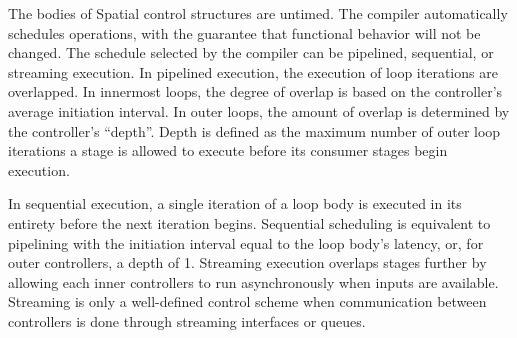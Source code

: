 The bodies of Spatial control structures are untimed. The compiler automatically schedules operations, with the guarantee that functional behavior will not be changed.
The schedule selected by the compiler can be pipelined, sequential, or streaming execution. In pipelined execution, the execution of loop iterations are overlapped.
In innermost loops, the degree of overlap is based on the controller's average initiation interval.
In outer loops, the amount of overlap is determined by the controller's ``depth''. Depth is defined as the maximum number of outer loop iterations a stage is allowed to execute before its consumer stages begin execution.

In sequential execution, a single iteration of a loop body is executed in its entirety before the next iteration begins.
Sequential scheduling is equivalent to pipelining with the initiation interval equal to the loop body's latency, or, for outer controllers, a depth of 1. Streaming execution overlaps stages further by allowing each inner controllers to run asynchronously when inputs are available.
Streaming is only a well-defined control scheme when communication between controllers is done through streaming interfaces or queues.




